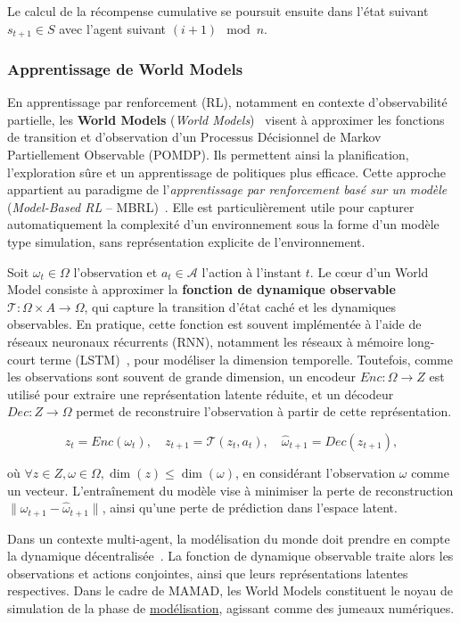 Le calcul de la récompense cumulative se poursuit ensuite dans l'état suivant $s_{t+1} \in S$ avec l'agent suivant $(i+1) \mod n$.

\subsubsection{Apprentissage de World Models}

En apprentissage par renforcement (RL), notamment en contexte d'observabilité partielle, les \textbf{World Models} (\textit{World Models})~\cite{ha2018recurrent} visent à approximer les fonctions de transition et d'observation d'un Processus Décisionnel de Markov Partiellement Observable (POMDP). Ils permettent ainsi la planification, l'exploration sûre et un apprentissage de politiques plus efficace. Cette approche appartient au paradigme de l'\textit{apprentissage par renforcement basé sur un modèle} (\textit{Model-Based RL} – MBRL)~\cite{moerland2020model}. Elle est particulièrement utile pour capturer automatiquement la complexité d'un environnement sous la forme d'un modèle type simulation, sans représentation explicite de l'environnement.

Soit $\omega_t \in \Omega$ l'observation et $a_t \in \mathcal{A}$ l'action à l'instant $t$. Le cœur d'un World Model consiste à approximer la \textbf{fonction de dynamique observable} $\mathcal{T}: \Omega \times A \rightarrow \Omega$, qui capture la transition d'état caché et les dynamiques observables. En pratique, cette fonction est souvent implémentée à l'aide de réseaux neuronaux récurrents (RNN), notamment les réseaux à mémoire long-court terme (LSTM)~\cite{hochreiter1997long}, pour modéliser la dimension temporelle. Toutefois, comme les observations sont souvent de grande dimension, un encodeur $Enc: \Omega \rightarrow Z$ est utilisé pour extraire une représentation latente réduite, et un décodeur $Dec: Z \rightarrow \Omega$ permet de reconstruire l'observation à partir de cette représentation.

\[
    z_t = Enc(\omega_t), \quad
    z_{t+1} = \mathcal{T}(z_t, a_t), \quad
    \hat{\omega}_{t+1} = Dec(z_{t+1}),
\]

où $\forall z \in Z, \omega \in \Omega, \dim(z) \leq \dim(\omega)$, en considérant l'observation $\omega$ comme un vecteur. L'entraînement du modèle vise à minimiser la perte de reconstruction $\|\omega_{t+1} - \hat{\omega}_{t+1}\|$, ainsi qu'une perte de prédiction dans l'espace latent.

Dans un contexte multi-agent, la modélisation du monde doit prendre en compte la dynamique décentralisée~\cite{yang2021representation}. La fonction de dynamique observable traite alors les observations et actions conjointes, ainsi que leurs représentations latentes respectives. Dans le cadre de MAMAD, les World Models constituent le noyau de simulation de la phase de \hyperref[sec:modelling]{modélisation}, agissant comme des jumeaux numériques.




